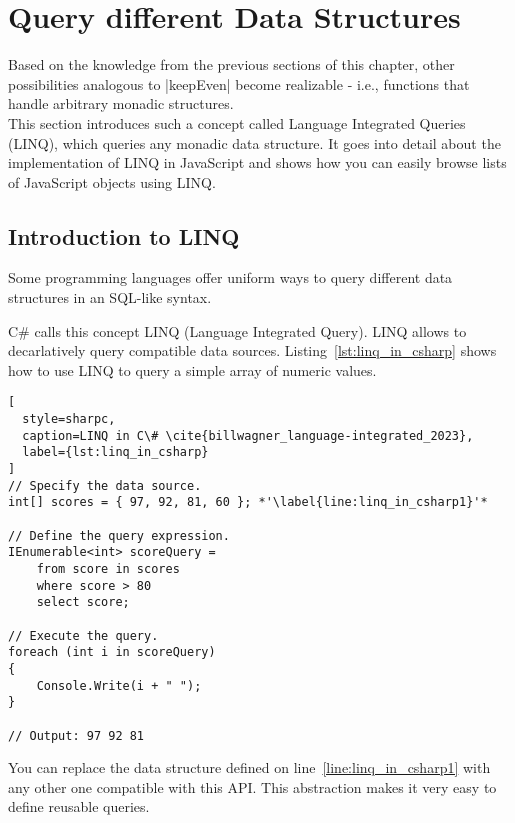 \section{Query different Data Structures}
\label{sec:Query different Data Structures}
Based on the knowledge from the previous sections of this chapter, other
possibilities analogous to |keepEven| become realizable - i.e., functions that
handle arbitrary monadic structures. \\ 
This section introduces such a concept called Language Integrated Queries
(LINQ), which queries any monadic data structure. It goes into detail
about the implementation of LINQ in JavaScript and shows how you can easily
browse lists of JavaScript objects using LINQ.

\subsection{Introduction to LINQ} %
\label{sub:Introduction to LINQ}
Some programming languages offer uniform ways to query different data
structures in an SQL-like syntax.

C\# calls this concept LINQ (Language Integrated Query). LINQ allows to
decarlatively query compatible data sources. Listing~\ref{lst:linq_in_csharp}
shows how to use LINQ to query a simple array of numeric values.

\begin{lstlisting}[
  style=sharpc,
  caption=LINQ in C\# \cite{billwagner_language-integrated_2023},
  label={lst:linq_in_csharp}
]
// Specify the data source.
int[] scores = { 97, 92, 81, 60 }; *'\label{line:linq_in_csharp1}'*

// Define the query expression.
IEnumerable<int> scoreQuery =
    from score in scores
    where score > 80
    select score;

// Execute the query.
foreach (int i in scoreQuery)
{
    Console.Write(i + " ");
}

// Output: 97 92 81
\end{lstlisting}

You can replace the data structure defined on line~\ref{line:linq_in_csharp1}
with any other one compatible with this API. This abstraction makes it very
easy to define reusable queries.


